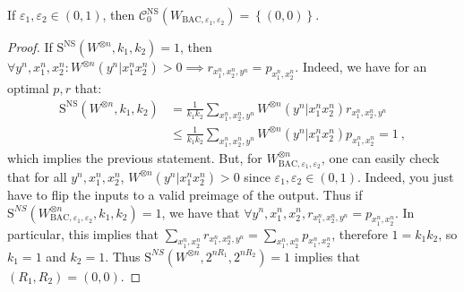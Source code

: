   \begin{proposition}
    \label{prop:NScapaNoisy}
    If $\varepsilon_1,\varepsilon_2 \in (0,1)$, then $\mathcal{C}_0^{\mathrm{NS}}(W_{\text{BAC},\varepsilon_1, \varepsilon_2}) = \left\{ (0,0) \right\}$.
  \end{proposition}
  \begin{proof}
    If $\mathrm{S}^{\mathrm{NS}}(W^{\otimes n},k_1,k_2) = 1$, then $\forall y^n,x_1^n,x_2^n : W^{\otimes n}(y^n|x_1^nx_2^n) > 0 \implies r_{x_1^n,x_2^n,y^n} = p_{x_1^n,x_2^n}$. Indeed, we have for an optimal $p,r$ that:
    \begin{equation}
      \begin{aligned}
        \mathrm{S}^{\mathrm{NS}}(W^{\otimes n},k_1,k_2) &= \frac{1}{k_1k_2} \sum_{x_1^n,x_2^n,y^n} W^{\otimes n}(y^n|x_1^nx_2^n)r_{x_1^n,x_2^n,y^n}\\
        &\leq \frac{1}{k_1k_2} \sum_{x_1^n,x_2^n,y^n} W^{\otimes n}(y^n|x_1^nx_2^n)p_{x_1^n,x_2^n} = 1 \ ,
      \end{aligned}
    \end{equation}
    which implies the previous statement. But, for $W_{\text{BAC},\varepsilon_1, \varepsilon_2}^{\otimes n}$, one can easily check that for all $y^n,x_1^n,x_2^n$, $W^{\otimes n}(y^n|x_1^nx_2^n) > 0$ since $\varepsilon_1,\varepsilon_2 \in (0,1)$. Indeed, you just have to flip the inputs to a valid preimage of the output. Thus if $\mathrm{S}^{NS}(W_{\text{BAC},\varepsilon_1, \varepsilon_2}^{\otimes n},k_1,k_2) = 1$, we have that $\forall y^n,x_1^n,x_2^n, r_{x_1^n,x_2^n,y^n} = p_{x_1^n,x_2^n}$. In particular, this implies that $\sum_{x_1^n,x_2^n} r_{x_1^n,x_2^n,y^n} = \sum_{x_1^n,x_2^n} p_{x_1^n,x_2^n}$, therefore $1 = k_1k_2$, so $k_1 = 1$ and $k_2 = 1$. Thus $\mathrm{S}^{NS}(W^{\otimes n},2^{nR_1},2^{nR_2}) = 1$ implies that $(R_1,R_2)=(0,0)$. 
  \end{proof}

